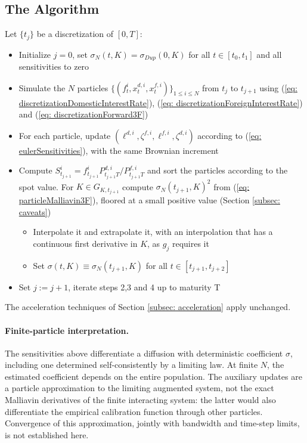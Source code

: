 \subsection{The Algorithm}
Let $\{t_j\}$ be a discretization of $[0,T]$:
\begin{itemize}
\item[1.] Initialize $j=0$, set $\sigma_N(t,K)=\sigma_{Dup}(0,K)$ for all $t\in [t_0,t_1]$ and all sensitivities to zero
\item[2.] Simulate the $N$ particles  $\{(f_t^i, x_t^{d,i}, x^{f,i}_t) \}_{1\leq i\leq N}$ from  $t_{j}$ to  $t_{j+1}$ using  (\ref{eq: discretizationDomesticInterestRate}), (\ref{eq: discretizationForeignInterestRate}) and (\ref{eq: discretizationForward3F})
\item[3.] For each particle, update $(\ell^{d,i},\zeta^{f,i},\ell^{f,i},\zeta^{d,i})$ according to (\ref{eq: eulerSensitivities}), with the same Brownian increment
\item[4.] Compute $S^i_{t_{j+1}}=f^i_{t_{j+1}}P^{d,i}_{t_{j+1}T}/P^{f,i}_{t_{j+1}T}$ and sort the particles according to the spot value. For $K\in G_{K,t_{j+1}}$ compute $\sigma_N(t_{j+1},K)^2$ from (\ref{eq: particleMalliavin3F}), floored at a small positive value (Section \ref{subsec: caveats})
\begin{itemize}
\item Interpolate it and extrapolate it, with an interpolation that has a continuous first derivative in $K$, as $g_j$ requires it
\item Set $\sigma(t,K)\equiv \sigma_N(t_{j+1},K)$ for all $t\in [t_{j+1},t_{j+2}]$
\end{itemize}
\item[5.] Set $j:=j+1$, iterate steps 2,3 and 4 up to maturity T
\end{itemize}
The acceleration techniques of Section \ref{subsec: acceleration} apply unchanged.
\paragraph{Finite-particle interpretation.}
The sensitivities above differentiate a diffusion with deterministic coefficient
$\sigma$, including one determined self-consistently by a limiting law. At finite
$N$, the estimated coefficient depends on the entire population. The auxiliary
updates are a particle approximation to the limiting augmented system, not the
exact Malliavin derivatives of the finite interacting system: the latter would
also differentiate the empirical calibration function through other particles.
Convergence of this approximation, jointly with bandwidth and time-step limits,
is not established here.
